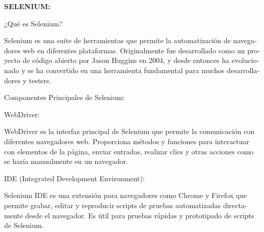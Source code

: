\documentclass[letterpaper]{article}
\begin{document}
\bigskip


\bigskip


\bigskip


\bigskip


\bigskip


\bigskip


\bigskip


\bigskip


\bigskip


\bigskip


\bigskip


\bigskip


\bigskip


\bigskip


\bigskip


\bigskip


\bigskip


\bigskip


\bigskip


\bigskip


\bigskip

{
\foreignlanguage{spanish}{\textbf{SELENIUM:}}}

{
\foreignlanguage{spanish}{¿Qué es Selenium?}}

{
\foreignlanguage{spanish}{Selenium es una suite de herramientas que permite la automatización de navegadores web en
diferentes plataformas. Originalmente fue desarrollado como un proyecto de código abierto por Jason Huggins en 2004, y
desde entonces ha evolucionado y se ha convertido en una herramienta fundamental para muchos desarrolladores y
testers.}}

{
\foreignlanguage{spanish}{Componentes Principales de Selenium:}}

{
\foreignlanguage{spanish}{WebDriver:}}

{
\foreignlanguage{spanish}{WebDriver es la interfaz principal de Selenium que permite la comunicación con diferentes
navegadores web. Proporciona métodos y funciones para interactuar con elementos de la página, enviar entradas, realizar
clics y otras acciones como se haría manualmente en un navegador.}}

{
\foreignlanguage{spanish}{IDE (Integrated Development Environment):}}

{
\foreignlanguage{spanish}{Selenium IDE es una extensión para navegadores como Chrome y Firefox que permite grabar,
editar y reproducir scripts de pruebas automatizadas directamente desde el navegador. Es útil para pruebas rápidas y
prototipado de scripts de Selenium.}}
\end{document}
